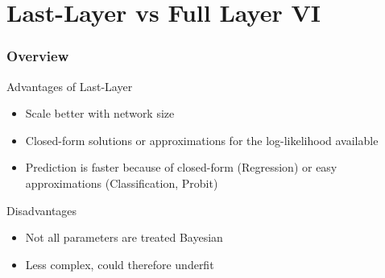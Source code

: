 \documentclass{beamer}
\begin{document}
        \section{Last-Layer vs Full Layer VI}
        \begin{frame}
            \frametitle{Overview}
            Advantages of Last-Layer
            \begin{itemize}
                \item Scale better with network size
                \item Closed-form solutions or approximations for the log-likelihood available
                \item Prediction is faster because of closed-form (Regression) or easy approximations (Classification, Probit)
            \end{itemize}
            Disadvantages
            \begin{itemize}
                \item Not all parameters are treated Bayesian
                \item Less complex, could therefore underfit
            \end{itemize}
        \end{frame}
\end{document}
